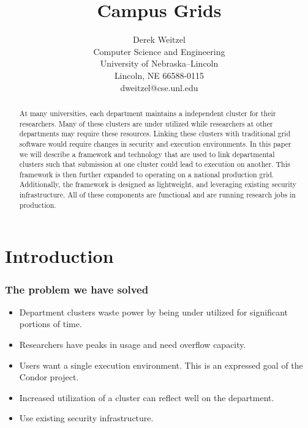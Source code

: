 \documentclass[11pt]{article}
\title{\bf Campus Grids}
\author{Derek Weitzel\\
Computer Science and Engineering\\
University of Nebraska--Lincoln\\
Lincoln, NE 66588-0115\\
dweitzel@cse.unl.edu
       }
\begin{document}
\maketitle

\begin{abstract}

At many universities, each department maintains a independent cluster for their researchers.  Many of these clusters are under utilized while researchers at other departments may require these resources.  Linking these clusters with traditional grid software would require changes in security and execution environments.  In this paper we will describe a framework and technology that are used to link departmental clusters such that submission at one cluster could lead to execution on another.  This framework is then further expanded to operating on a national production grid.  Additionally, the framework is designed as lightweight, and leveraging existing security infrastructure.   All of these components are functional and are running research jobs in production.

\end{abstract}



\section{Introduction}
\label{sec:Introduction}

\subsubsection* {The problem we have solved}

\begin{itemize}

\item Department clusters waste power by being under utilized for significant portions of time.
\item Researchers have peaks in usage and need overflow capacity.
\item Users want a single execution environment.  This is an expressed goal of the Condor project.
\item Increased utilization of a cluster can reflect well on the department.
\item Use existing security infrastructure.


\end{itemize}
\end{document}
